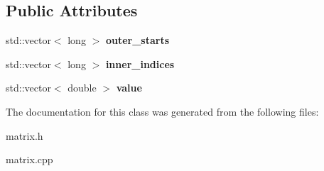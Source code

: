 \subsection*{Public Attributes}
\begin{DoxyCompactItemize}
\item 
std\+::vector$<$ long $>$ {\bfseries outer\+\_\+starts}\hypertarget{classMat_a4d8c91151fc8798ffe37835a6007e2f3}{}\label{classMat_a4d8c91151fc8798ffe37835a6007e2f3}

\item 
std\+::vector$<$ long $>$ {\bfseries inner\+\_\+indices}\hypertarget{classMat_adcb83b38680b48f2d29302e204294d79}{}\label{classMat_adcb83b38680b48f2d29302e204294d79}

\item 
std\+::vector$<$ double $>$ {\bfseries value}\hypertarget{classMat_a2c02c17a5641602e08ac5071a5c7da72}{}\label{classMat_a2c02c17a5641602e08ac5071a5c7da72}

\end{DoxyCompactItemize}


The documentation for this class was generated from the following files\+:\begin{DoxyCompactItemize}
\item 
matrix.\+h\item 
matrix.\+cpp\end{DoxyCompactItemize}
